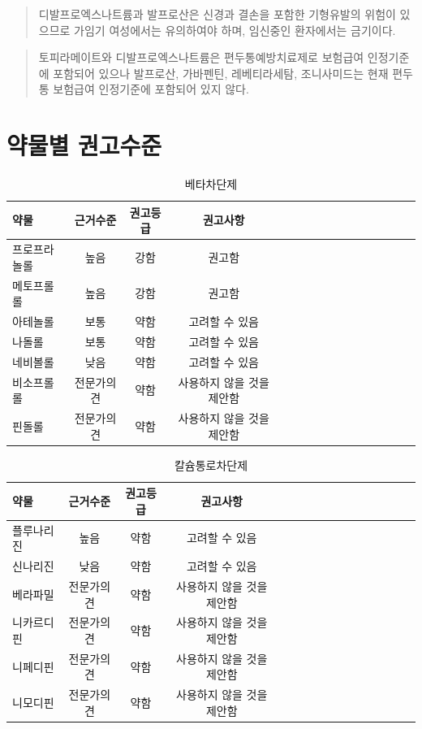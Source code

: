\documentclass[]{book}
\begin{document}
\begin{quote}
디발프로엑스나트륨과 발프로산은 신경과 결손을 포함한 기형유발의 위험이 있으므로 가임기 여성에서는 유의하여야 하며, 임신중인 환자에서는 금기이다.
\end{quote}

\begin{quote}
토피라메이트와 디발프로엑스나트륨은 편두통예방치료제로 보험급여 인정기준에 포함되어 있으나 발프로산, 가바펜틴, 레베티라세탐, 조니사미드는 현재 편두통 보험급여 인정기준에 포함되어 있지 않다.
\end{quote}

\hypertarget{section-4}{%
\section{약물별 권고수준}\label{section-4}}

\begin{longtable}{lccclccclccclccc}
\caption{\label{tab:unnamed-chunk-2}베타차단제}\\
\toprule
약물 & 근거수준 & 권고등급 & 권고사항\\
\midrule
프로프라놀롤 & 높음 & 강함 & 권고함\\
메토프롤롤 & 높음 & 강함 & 권고함\\
아테놀롤 & 보통 & 약함 & 고려할 수 있음\\
나돌롤 & 보통 & 약함 & 고려할 수 있음\\
네비볼롤 & 낮음 & 약함 & 고려할 수 있음\\
\addlinespace
비소프롤롤 & 전문가의견 & 약함 & 사용하지 않을 것을 제안함\\
핀돌롤 & 전문가의견 & 약함 & 사용하지 않을 것을 제안함\\
\bottomrule
\end{longtable}

\begin{longtable}{lccclccclccclccc}
\caption{\label{tab:unnamed-chunk-3}칼슘통로차단제}\\
\toprule
약물 & 근거수준 & 권고등급 & 권고사항\\
\midrule
플루나리진 & 높음 & 약함 & 고려할 수 있음\\
신나리진 & 낮음 & 약함 & 고려할 수 있음\\
베라파밀 & 전문가의견 & 약함 & 사용하지 않을 것을 제안함\\
니카르디핀 & 전문가의견 & 약함 & 사용하지 않을 것을 제안함\\
니페디핀 & 전문가의견 & 약함 & 사용하지 않을 것을 제안함\\
\addlinespace
니모디핀 & 전문가의견 & 약함 & 사용하지 않을 것을 제안함\\
\bottomrule
\end{longtable}
\end{document}
